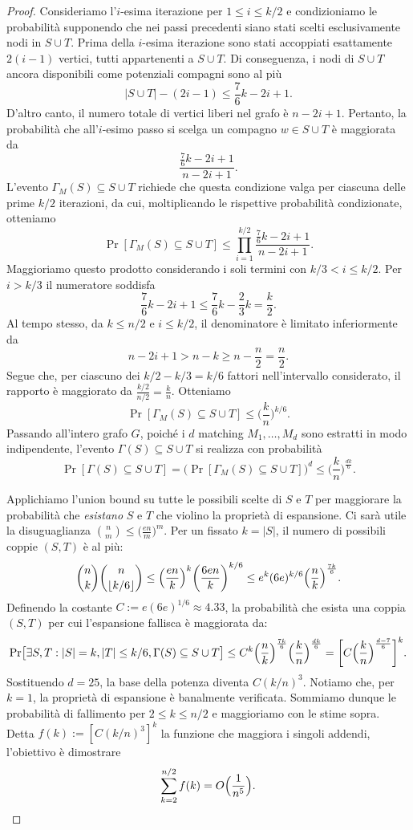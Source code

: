 \begin{proof}
	Consideriamo l'$i$-esima iterazione per $1 \le i \le k/2$ e condizioniamo le
	probabilità supponendo che nei passi precedenti siano stati scelti
	esclusivamente nodi in $S \cup T$.
	Prima della $i$-esima iterazione sono stati accoppiati esattamente
	$2(i - 1)$ vertici, tutti appartenenti a $S \cup T$.
	Di conseguenza, i nodi di $S \cup T$ ancora disponibili come potenziali
	compagni sono al più
	\[
		|S \cup T| - (2i - 1) \le \frac{7}{6}k - 2i + 1.
	\]
	D'altro canto, il numero totale di vertici liberi nel grafo è $n - 2i + 1$.
	Pertanto, la probabilità che all'$i$-esimo passo si scelga un compagno
	$w \in S \cup T$ è maggiorata da
	\[
		\frac{\frac{7}{6}k - 2i + 1}{n - 2i + 1}.
	\]
	L'evento $\Gamma_M(S) \subseteq S \cup T$ richiede che questa
	condizione valga per ciascuna delle prime $k/2$ iterazioni, da cui,
	moltiplicando le rispettive probabilità condizionate, otteniamo
	\[
		\Pr[\Gamma_M(S) \subseteq S \cup T] \le
			\prod_{i=1}^{k/2} \frac{\frac{7}{6}k - 2i + 1}{n - 2i + 1}.
	\]
	Maggioriamo questo prodotto considerando i soli termini con
	$k / 3 < i \le k / 2$. Per $i > k / 3$ il numeratore soddisfa
	\[
		\frac{7}{6}k - 2i + 1 \le \frac{7}{6}k - \frac{2}{3}k = \frac{k}{2}.
	\]
	Al tempo stesso, da $k \le n/2$ e $i \le k/2$, il denominatore è limitato
	inferiormente da
	\[
		n - 2i + 1 > n - k \ge n - \frac{n}{2} = \frac{n}{2}.
	\]
	Segue che, per ciascuno dei $k/2 - k/3 = k/6$ fattori nell'intervallo
	considerato, il rapporto è maggiorato da $\frac{k/2}{n/2} = \frac{k}{n}$.
	Otteniamo
	\[
		\Pr[\Gamma_M(S) \subseteq S \cup T] \le \biggl(\frac{k}{n}\biggr)^{k/6}.
	\]
	Passando all'intero grafo $G$, poiché i $d$ matching $M_1, \dots, M_d$ sono
	estratti in modo indipendente, l'evento $\Gamma(S) \subseteq S \cup T$ si
	realizza con probabilità
	\[
		\Pr[\Gamma(S) \subseteq S \cup T]
			= \bigl(\Pr[\Gamma_M(S) \subseteq S \cup T]\bigr)^d
			\le \biggl(\frac{k}{n}\biggr)^{\frac{dk}{6}}.
	\]

	Applichiamo l'union bound su tutte le possibili scelte di $S$ e $T$ per
	maggiorare la probabilità che \emph{esistano} $S$ e $T$ che violino la
	proprietà di espansione.
	Ci sarà utile la disuguaglianza
	$\binom{n}{m} \le \bigl(\frac{en}{m}\bigr)^m$.
	Per un fissato $k = |S|$, il numero di possibili coppie $(S, T)$ è al più:
	\[
		\binom{n}{k} \binom{n}{\lfloor k/6 \rfloor}
		\le \Bigl(\frac{en}{k}\Bigr)^k \biggl(\frac{6en}{k}\biggr)^{k/6}
		\le e^k (6e)^{k/6} \Bigl(\frac{n}{k}\Bigr)^{\frac{7k}{6}}.
	\]
	Definendo la costante $C := e (6e)^{1/6} \approx 4.33$, la probabilità che
	esista una coppia $(S, T)$ per cui l'espansione fallisca è maggiorata da:
	\[
		\Pr\bigl[\exists S, T : |S|=k, |T| \le k/6, \Gamma(S) \subseteq S \cup T\bigr]
		\le C^k \Bigl(\frac{n}{k}\Bigr)^{\frac{7k}{6}}
			\Bigl(\frac{k}{n}\Bigr)^{\frac{dk}{6}}
		= \bigg[ C \Bigl(\frac{k}{n}\Bigr)^{\frac{d - 7}{6}} \bigg]^k.
	\]
	Sostituendo $d = 25$, la base della potenza diventa $C (k/n)^3$.
	Notiamo che, per $k = 1$, la proprietà di espansione è banalmente
	verificata. Sommiamo dunque le probabilità di fallimento per
	$2 \le k \le n/2$ e maggioriamo con le stime sopra.
	Detta $f(k) := [ C (k/n)^3 ]^k$ la funzione che maggiora i singoli
	addendi, l'obiettivo è dimostrare
	\[
		\sum_{k = 2}^{n / 2} f(k) = O\Bigl(\frac{1}{n^5}\Bigr).
	\]


\end{proof}
